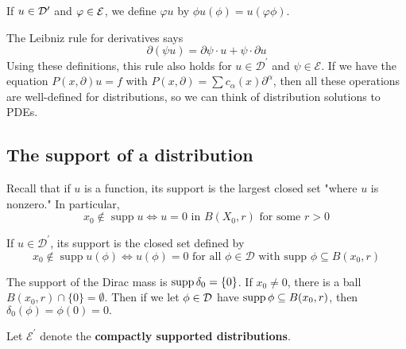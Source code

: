 \begin{definition}
If $u\in \mathcal{D}'$ and $\varphi \in \mathcal{E}$, we define $\varphi u$ by $\phi u(\phi) = u (\varphi \phi)$.
\end{definition}
The Leibniz rule for derivatives says
$$
\partial(\psi u)=\partial \psi \cdot u+\psi \cdot \partial u
$$
Using these definitions, this rule also holds for $u \in \mathcal{D}^{\prime}$ and $\psi \in \mathcal{E}$.
If we have the equation $P(x, \partial) u=f$ with $P(x, \partial)=\sum c_{\alpha}(x) \partial^{\alpha}$, then all these operations are well-defined for distributions, so we can think of distribution solutions to PDEs.

\subsection{The support of a distribution}
Recall that if $u$ is a function, its support is the largest closed set "where $u$ is nonzero." In particular,
\[
    x_{0} \notin \operatorname{supp} u \Longleftrightarrow u=0 \text{ in } B\left(X_{0}, r\right) \text{ for some } r>0
\]

\begin{definition}
    If $u \in \mathcal{D}^{\prime}$, its support is the closed set defined by
    $$
    x_{0} \notin \operatorname{supp} u(\phi) \Longleftrightarrow u(\phi)=0 \text { for all } \phi \in \mathcal{D} \text { with supp } \phi \subseteq B\left(x_{0}, r\right)
    $$
\end{definition}

\begin{example}
The support of the Dirac mass is $\operatorname{supp} \delta_0 = \{0\}$. If $x_0 \neq 0$, there is a ball $B(x_0,r) \cap \{0\} = \emptyset$. Then if we let $\phi\in \mathcal{D}$ have $\operatorname{supp} \phi \subseteq B(x_0,r)$, then $\delta_0(\phi) = \phi(0)=0.$

\end{example}
 Let $ \mathcal{E}^{\prime}$ denote the \textbf{compactly supported distributions}. 

